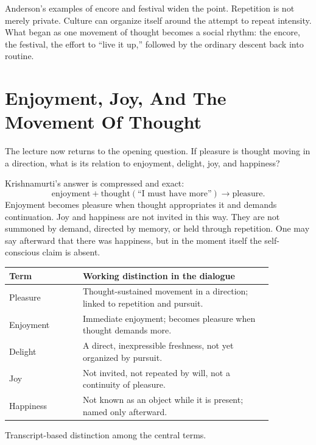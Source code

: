Anderson's examples of encore and festival widen the point. Repetition is not merely private. Culture can organize itself around the attempt to repeat intensity. What began as one movement of thought becomes a social rhythm: the encore, the festival, the effort to ``live it up,'' followed by the ordinary descent back into routine.

\section{Enjoyment, Joy, And The Movement Of Thought}

The lecture now returns to the opening question. If pleasure is thought moving in a direction, what is its relation to enjoyment, delight, joy, and happiness?

Krishnamurti's answer is compressed and exact:
\begin{equation}
\text{enjoyment}
+
\text{thought}(\text{``I must have more''})
\longrightarrow
\text{pleasure}.
\end{equation}
Enjoyment becomes pleasure when thought appropriates it and demands continuation. Joy and happiness are not invited in this way. They are not summoned by demand, directed by memory, or held through repetition. One may say afterward that there was happiness, but in the moment itself the self-conscious claim is absent.

\begin{table}
\centering
\begin{tabular}{|p{0.24\linewidth}|p{0.62\linewidth}|}
\hline
\textbf{Term} & \textbf{Working distinction in the dialogue} \\
\hline
Pleasure & Thought-sustained movement in a direction; linked to repetition and pursuit. \\
\hline
Enjoyment & Immediate enjoyment; becomes pleasure when thought demands more. \\
\hline
Delight & A direct, inexpressible freshness, not yet organized by pursuit. \\
\hline
Joy & Not invited, not repeated by will, not a continuity of pleasure. \\
\hline
Happiness & Not known as an object while it is present; named only afterward. \\
\hline
\end{tabular}

Transcript-based distinction among the central terms.
\end{table}

